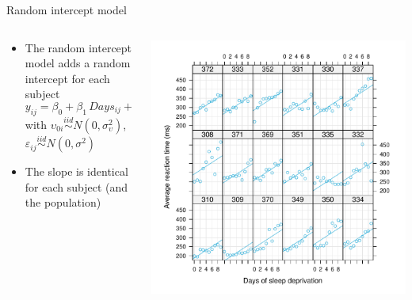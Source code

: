 \documentclass[aspectratio=169]{beamer}
\begin{document}
\begin{frame}{Random intercept model}
  \begin{columns}
    \begin{column}{.5\textwidth}
  \begin{itemize}
\item The random intercept model adds a random intercept for each subject
\[
  y_{ij} = \beta_0 + \beta_1\,Days_{ij} + \upsilon_{0i} + \varepsilon_i
\]
with $\upsilon_{0i} \overset{iid}{\sim} N(0, \sigma^2_{\upsilon})$,
      $\varepsilon_{ij} \overset{iid}{\sim} N(0, \sigma^2)$
    \item The slope is identical for each subject (and the population)
  \end{itemize}
      \vspace{2.2cm}
    \end{column}
    \begin{column}{.5\textwidth}
      \includegraphics[scale=.5]{../figures/sleep_random_intercept}
    \end{column}
  \end{columns}
\end{frame}

\end{document}
